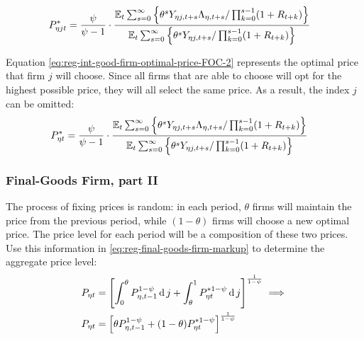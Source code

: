 \documentclass[../thesis.tex]{subfiles}
\begin{document}
\vspace*{-1cm}

\begin{align}
	\label{eq:reg-int-good-firm-optimal-price-FOC-2}
	P_{\eta jt}^{\ast} &= 
	\frac{\psi}{\psi-1} \cdot
	\frac{
		{\mathbb{E}_{t}} \sum_{s=0}^{\infty} \left\{ 
		\theta^s Y_{\eta j,t+s} \Lambda_{\eta, t+s} / \prod_{k=0}^{s-1}(1+R_{t+k}) \right\}} {{\mathbb{E}_{t}} \sum_{s=0}^{\infty} \left\{
		\theta^s Y_{\eta j,t+s} / \prod_{k=0}^{s-1}(1+R_{t+k}) \right\}}
\end{align}


Equation \ref{eq:reg-int-good-firm-optimal-price-FOC-2} represents the optimal price that firm $j$ will choose. Since all firms that are able to choose will opt for the highest possible price, they will all select the same price. As a result, the index $j$ can be omitted:
\begin{align}
	\label{eq:reg-int-good-firm-optimal-price-FOC-3}
	P_{\eta t}^{\ast} &= 
	\frac{\psi}{\psi-1} \cdot
	\frac{
		{\mathbb{E}_{t}} \sum_{s=0}^{\infty} \left\{ 
		\theta^s Y_{\eta j,t+s} \Lambda_{\eta, t+s} / \prod_{k=0}^{s-1}(1+R_{t+k}) \right\}} {{\mathbb{E}_{t}} \sum_{s=0}^{\infty} \left\{
		\theta^s Y_{\eta j,t+s} / \prod_{k=0}^{s-1}(1+R_{t+k}) \right\}}
\end{align}


\subsubsection*{Final-Goods Firm, part II}

The process of fixing prices is random: in each period, $\theta$ firms will maintain the price from the previous period, while $(1-\theta)$ firms will choose a new optimal price. The price level for each period will be a composition of these two prices. Use this information in \ref{eq:reg-final-goods-firm-markup} to determine the aggregate price level:
\begin{align}
	P_{\eta t} & = \left[ \int_{0}^{\theta} P_{\eta, t-1}^{1-\psi} \operatorname{d} j + \int_{\theta}^{1} P_{\eta t}^{\ast 1-\psi} \operatorname{d} j \right]^{\frac{1}{1-\psi}}  \implies \nonumber \\
	P_{\eta t} & = \left[ \theta P_{\eta, t-1}^{1-\psi} + (1-\theta) P_{\eta t}^{\ast 1-\psi} \right]^\frac{1}{1-\psi} \label{eq:reg-general-price-level}
\end{align}
\end{document}
